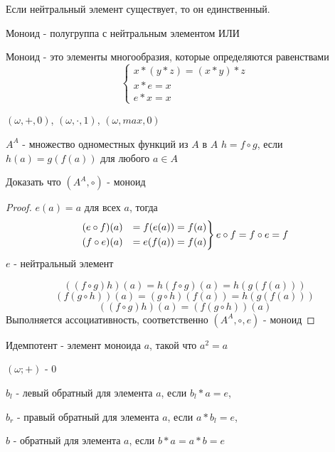\documentclass[../main/document.tex]{subfiles}
\begin{document}
\begin{cnsq}
Если нейтральный элемент существует, то он единственный.
\end{cnsq}
\begin{dfn}[Моноид]
Моноид - полугруппа с нейтральным элементом ИЛИ

Моноид - это элементы многообразия, которые определяются равенствами
$$
\begin{cases}
x*(y*z)=(x*y)*z\\
x*e=x\\
e*x=x
\end{cases}$$
\end{dfn}
\begin{exm}

$(\omega,+,0)$, $(\omega,\cdot,1)$, $(\omega,max,0)$

$A^A$ - множество одноместных функций из $A$ в $A$
$h=f\circ g$, если $h(a)=g(f(a))$ для любого $a\in A$

Доказать что $(A^A,\circ)$ - моноид
\begin{proof}
$e(a)=a$ для всех $a$, тогда
\begin{equation*}
\begin{rcases}
(e\circ f)(a) &= f(e(a))= f(a) \\
(f\circ e)(a) &= e(f(a))= f(a) 
\end{rcases}
e\circ f=f\circ e=f
\end{equation*}
$e$ - нейтральный элемент

$$((f\circ g)h)(a)=h(f\circ g)(a)=h(g(f(a)))$$
$$(f(g\circ h))(a)=(g\circ h)(f(a))=h(g(f(a)))$$
$$((f\circ g)h)(a)=(f(g\circ h))(a)$$
Выполняется ассоциативность, соответственно $(A^A,\circ,e)$ - моноид

\end{proof}
\end{exm}
\begin{dfn}[Идемпотент]
Идемпотент - элемент моноида $a$, такой что $a^2=a$
\end{dfn}

\begin{exm}
$(\omega;+)$ - $0$
\end{exm}

\begin{dfn}$ $\\

$b_l$ - левый обратный для элемента $a$, если $b_l*a=e$,

$b_r$ - правый обратный для элемента $a$, если $a*b_l=e$,

$b$ - обратный для элемента $a$, если $b*a=a*b=e$
\end{dfn}
\end{document}

